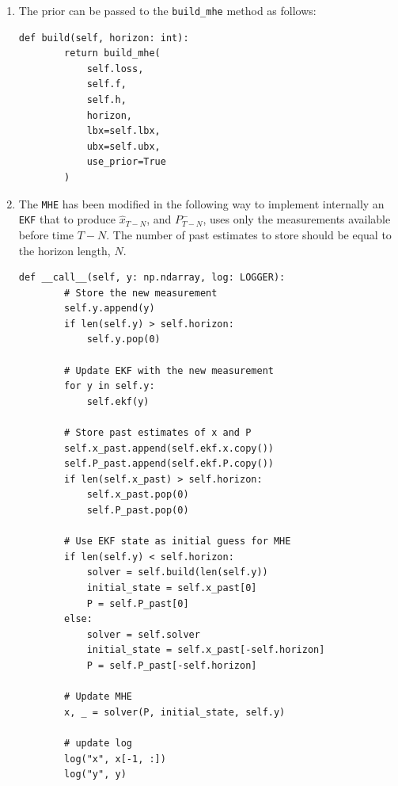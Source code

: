 \documentclass[]{article}
\begin{document}
\begin{enumerate}
	\item The prior can be passed to the \texttt{build\_mhe} method as follows:
	\begin{lstlisting}[style=python]
	def build(self, horizon: int):
        return build_mhe(
            self.loss,
            self.f,
            self.h,
            horizon,
            lbx=self.lbx,
            ubx=self.ubx,
            use_prior=True
        )
	\end{lstlisting}
	
	\item The \texttt{MHE} has been modified in the following way to implement internally an \texttt{EKF} that to produce $\hat{x}_{T-N}$, and $P^-_{T-N}$, uses only the measurements available before time $T-N$. 
	The number of past estimates to store should be equal to the horizon length, $N$.
	\begin{lstlisting}[style=python]
		def __call__(self, y: np.ndarray, log: LOGGER):
        # Store the new measurement
        self.y.append(y)
        if len(self.y) > self.horizon:
            self.y.pop(0)

        # Update EKF with the new measurement
        for y in self.y:
            self.ekf(y)

        # Store past estimates of x and P
        self.x_past.append(self.ekf.x.copy())
        self.P_past.append(self.ekf.P.copy())
        if len(self.x_past) > self.horizon:
            self.x_past.pop(0)
            self.P_past.pop(0)

        # Use EKF state as initial guess for MHE
        if len(self.y) < self.horizon:
            solver = self.build(len(self.y))
            initial_state = self.x_past[0]
            P = self.P_past[0]
        else:
            solver = self.solver
            initial_state = self.x_past[-self.horizon]
            P = self.P_past[-self.horizon]

        # Update MHE
        x, _ = solver(P, initial_state, self.y)

        # update log
        log("x", x[-1, :])
        log("y", y)
	\end{lstlisting}
	

\end{enumerate}
\end{document}
